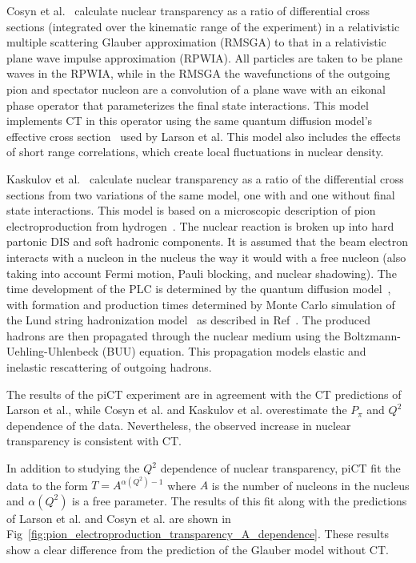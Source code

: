 Cosyn et al.~\cite{Cosyn_2008} calculate nuclear transparency as a ratio of
differential cross sections (integrated over the kinematic range of the
experiment) in a relativistic multiple scattering Glauber approximation (RMSGA)
to that in a relativistic plane wave impulse approximation (RPWIA).
All particles are taken to be plane waves in the RPWIA, while in the RMSGA
the wavefunctions of the outgoing pion and spectator nucleon are a convolution
of a plane wave with an eikonal phase operator that parameterizes the final
state interactions.
This model implements CT in this operator using the same quantum
diffusion model's effective cross section~\cite{Farrar_1988} used by Larson et
al.
This model also includes the effects of short range correlations, which create
local fluctuations in nuclear density.


Kaskulov et al.~\cite{Kaskulov_2009, Kaskulov_2012} calculate nuclear
transparency as a ratio of the differential cross sections from two variations
of the same model, one with and one without final state interactions.
This model is based on a microscopic description of pion
electroproduction from hydrogen~\cite{Kaskulov_2008}.
The nuclear reaction is broken up into hard partonic DIS and soft hadronic
components.
It is assumed that the beam electron interacts with a
nucleon in the nucleus the way it would with a free nucleon (also taking into
account Fermi motion, Pauli blocking, and nuclear shadowing).
The time development of the PLC is determined by the quantum diffusion
model~\cite{Farrar_1988}, with formation and production times determined by
Monte Carlo simulation of the Lund string hadronization
model~\cite{Anderson_1983} as described in Ref~\cite{Gallmeister_2005}.
The produced hadrons are then propagated through the nuclear medium using the
Boltzmann-Uehling-Uhlenbeck (BUU) equation.
This propagation models elastic and inelastic rescattering of outgoing hadrons.


The results of the piCT experiment are in agreement with the CT predictions of
Larson et al., while Cosyn et al. and Kaskulov et al. overestimate the $P_\pi$
and $Q^2$ dependence of the data.
Nevertheless, the observed increase in nuclear transparency is consistent with
CT.


In addition to studying the $Q^2$ dependence of nuclear transparency, piCT
fit the data to the form $T=A^{\alpha(Q^2)-1}$ where $A$ is the
number of nucleons in the nucleus and $\alpha(Q^2)$ is a free parameter.
The results of this fit along with the predictions of Larson et al. and Cosyn et
al. are shown in Fig~\ref{fig:pion_electroproduction_transparency_A_dependence}.
These results show a clear difference from the prediction of the Glauber model
without CT.

